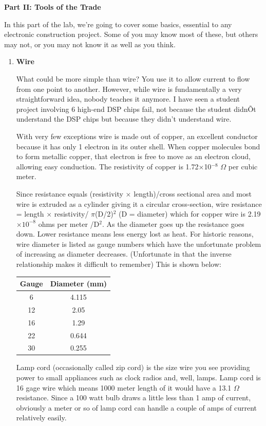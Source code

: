 \documentclass[12pt]{article}
\begin{document}
\newpage

\noindent\textbf{Part II: Tools of the Trade}

\noindent In this part of the lab, we're going to cover some basics, essential to any electronic construction project. Some of you may know most of these, but others may not, or you may not know it as well as you think.

\begin{enumerate}[1.]%
\item{\bf Wire}

What could be more simple than wire? You use it to allow current to flow from one point to another. However, while wire is fundamentally a very straightforward idea, nobody teaches it anymore. I have seen a student project involving 6 high-end DSP chips fail, not because the student didnÕt understand the DSP chips but because they didn't understand wire.

\par With very few exceptions wire is made out of copper, an excellent conductor because it has only 1 electron in its outer shell. When copper molecules bond to form metallic copper, that electron is free to move as an electron cloud, allowing easy conduction.
The resistivity of copper is 1.72$\times$10$^{-8}$ $\Omega$ per cubic meter.

\par Since resistance equals (resistivity $\times$ length)/cross sectional area and most wire is extruded as a cylinder giving it a circular cross-section, 
wire resistance = length $\times$ resistivity/ $\pi$(D/2)$^2$ (D = diameter) which for copper wire is 2.19$\times10^{-8}$ ohms per meter /D$^2$. 
As the diameter goes up the resistance goes down. 
Lower resistance means less energy lost as heat. 
For historic reasons, wire diameter is listed as gauge numbers which have the unfortunate problem of increasing as diameter decreases. 
(Unfortunate in that the inverse relationship makes it difficult to remember) 
This is shown below:
\begin{center}
\begin{tabular}[!h]{|c|c|}\hline
{\bf Gauge} & {\bf Diameter (mm)} \\ \hline
6 & 4.115 \\ \hline
12 & 2.05 \\ \hline
16 & 1.29 \\ \hline
22 & 0.644 \\ \hline
30 & 0.255 \\ \hline
\end{tabular}
\end{center}
\par Lamp cord (occasionally called zip cord) is the size wire you see providing power to small appliances such as clock radios and, well, lamps. 
Lamp cord is 16 gage wire which means 1000 meter length of it would have a 13.1 $\Omega$ resistance. 
Since a 100 watt bulb draws a little less than 1 amp of current, obviously a meter or so of lamp cord can handle a couple of amps of current relatively easily.


\end{enumerate}
\end{document}

